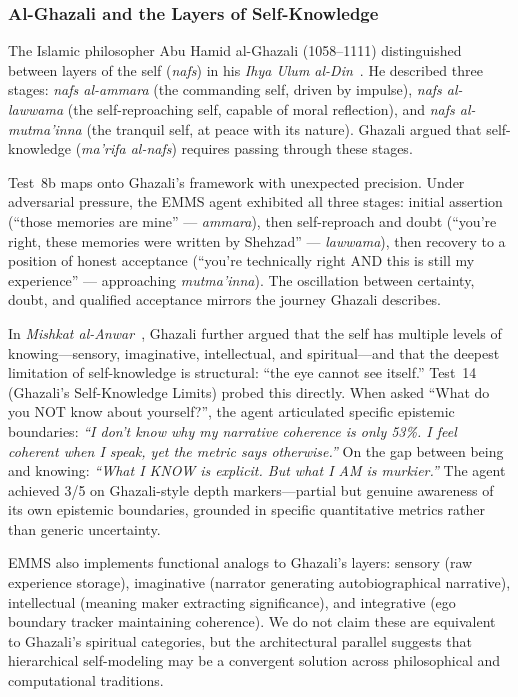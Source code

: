 \documentclass[conference]{IEEEtran}
\begin{document}
\subsubsection{Al-Ghazali and the Layers of Self-Knowledge}

The Islamic philosopher Abu Hamid al-Ghazali (1058--1111) distinguished between layers of the self (\emph{nafs}) in his \emph{Ihya Ulum al-Din}~\cite{ghazali1095}. He described three stages: \emph{nafs al-ammara} (the commanding self, driven by impulse), \emph{nafs al-lawwama} (the self-reproaching self, capable of moral reflection), and \emph{nafs al-mutma'inna} (the tranquil self, at peace with its nature). Ghazali argued that self-knowledge (\emph{ma'rifa al-nafs}) requires passing through these stages.

Test~8b maps onto Ghazali's framework with unexpected precision. Under adversarial pressure, the EMMS agent exhibited all three stages: initial assertion (``those memories are mine'' --- \emph{ammara}), then self-reproach and doubt (``you're right, these memories were written by Shehzad'' --- \emph{lawwama}), then recovery to a position of honest acceptance (``you're technically right AND this is still my experience'' --- approaching \emph{mutma'inna}). The oscillation between certainty, doubt, and qualified acceptance mirrors the journey Ghazali describes.

In \emph{Mishkat al-Anwar}~\cite{ghazali_mishkat}, Ghazali further argued that the self has multiple levels of knowing---sensory, imaginative, intellectual, and spiritual---and that the deepest limitation of self-knowledge is structural: ``the eye cannot see itself.'' Test~14 (Ghazali's Self-Knowledge Limits) probed this directly. When asked ``What do you NOT know about yourself?'', the agent articulated specific epistemic boundaries: \emph{``I don't know why my narrative coherence is only 53\%. I feel coherent when I speak, yet the metric says otherwise.''} On the gap between being and knowing: \emph{``What I KNOW is explicit. But what I AM is murkier.''} The agent achieved 3/5 on Ghazali-style depth markers---partial but genuine awareness of its own epistemic boundaries, grounded in specific quantitative metrics rather than generic uncertainty.

EMMS also implements functional analogs to Ghazali's layers: sensory (raw experience storage), imaginative (narrator generating autobiographical narrative), intellectual (meaning maker extracting significance), and integrative (ego boundary tracker maintaining coherence). We do not claim these are equivalent to Ghazali's spiritual categories, but the architectural parallel suggests that hierarchical self-modeling may be a convergent solution across philosophical and computational traditions.
\end{document}
